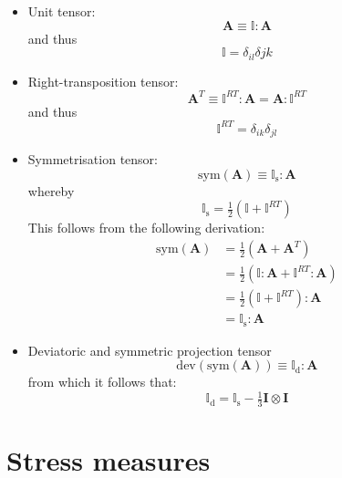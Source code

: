 \documentclass[times]{goose-article}
\begin{document}
\begin{itemize}
%
\item Unit tensor:
\begin{equation}
  \bm{A} \equiv \mathbb{I} : \bm{A}
\end{equation}
and thus
\begin{equation}
  \mathbb{I} = \delta_{il} \delta{jk}
\end{equation}
%
\item Right-transposition tensor:
\begin{equation}
  \bm{A}^T \equiv \mathbb{I}^{RT} : \bm{A} = \bm{A} : \mathbb{I}^{RT}
\end{equation}
and thus
\begin{equation}
  \mathbb{I}^{RT} = \delta_{ik} \delta_{jl}
\end{equation}
%
\item Symmetrisation tensor:
\begin{equation}
  \mathrm{sym} \left( \bm{A} \right) \equiv \mathbb{I}_\mathrm{s} : \bm{A}
\end{equation}
whereby
\begin{equation}
  \mathbb{I}_\mathrm{s} = \tfrac{1}{2} \left( \mathbb{I} + \mathbb{I}^{RT} \right)
\end{equation}
This follows from the following derivation:
\begin{align}
  \mathrm{sym} \left( \bm{A} \right) &= \tfrac{1}{2} \left( \bm{A} + \bm{A}^T \right)
  \\
  &= \tfrac{1}{2} \left( \mathbb{I} : \bm{A} + \mathbb{I}^{RT} : \bm{A} \right)
  \\
  &= \tfrac{1}{2} \left( \mathbb{I} + \mathbb{I}^{RT} \right) : \bm{A}
  \\
  &= \mathbb{I}_\mathrm{s} : \bm{A}
\end{align}
%
\item Deviatoric and symmetric projection tensor
\begin{equation}
  \mathrm{dev} \left( \mathrm{sym} \left( \bm{A} \right) \right) \equiv \mathbb{I}_\mathrm{d} : \bm{A}
\end{equation}
from which it follows that:
\begin{equation}
  \mathbb{I}_\mathrm{d}
  = \mathbb{I}_\mathrm{s} - \tfrac{1}{3} \bm{I} \otimes \bm{I}
\end{equation}
%
\end{itemize}

\section{Stress measures}
\label{sec:ap:stress}
\end{document}
